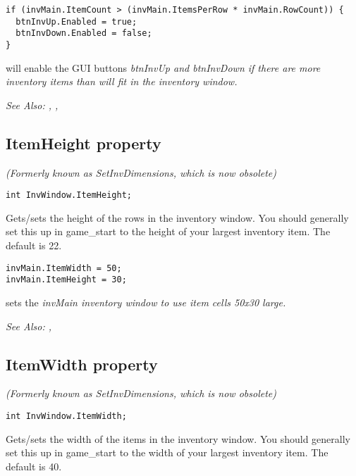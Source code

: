 \begin{verbatim}
if (invMain.ItemCount > (invMain.ItemsPerRow * invMain.RowCount)) {
  btnInvUp.Enabled = true;
  btnInvDown.Enabled = false;
}
\end{verbatim}
will enable the GUI buttons \it{btnInvUp} and \it{btnInvDown} if there are more
inventory items than will fit in the inventory window.

\it{See Also:} ,
,


\subsection{ItemHeight property}\label{InvWindow.ItemHeight}%

\it{(Formerly known as SetInvDimensions, which is now obsolete)}

\begin{verbatim}
int InvWindow.ItemHeight;
\end{verbatim}
Gets/sets the height of the rows in the inventory window. You should generally set this
up in game_start to the height of your largest inventory item. The default is 22.

\begin{verbatim}
invMain.ItemWidth = 50;
invMain.ItemHeight = 30;
\end{verbatim}
sets the \it{invMain} inventory window to use item cells 50x30 large.

\it{See Also:} ,


\subsection{ItemWidth property}\label{InvWindow.ItemWidth}%

\it{(Formerly known as SetInvDimensions, which is now obsolete)}

\begin{verbatim}
int InvWindow.ItemWidth;
\end{verbatim}
Gets/sets the width of the items in the inventory window. You should generally set this
up in game_start to the width of your largest inventory item. The default is 40.

